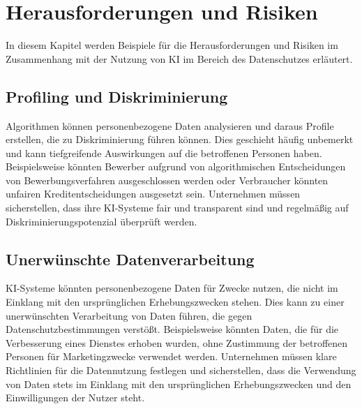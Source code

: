 \chapter{Herausforderungen und Risiken}

In diesem Kapitel werden Beispiele für die Herausforderungen und Risiken im Zusammenhang mit
der Nutzung von KI im Bereich des Datenschutzes erläutert. 




\section{Profiling und Diskriminierung}

Algorithmen können personenbezogene Daten analysieren und daraus Profile
erstellen, die zu Diskriminierung führen können. Dies geschieht häufig unbemerkt
und kann tiefgreifende Auswirkungen auf die betroffenen Personen haben.
Beispielsweise könnten Bewerber aufgrund von algorithmischen Entscheidungen von
Bewerbungsverfahren ausgeschlossen werden oder Verbraucher könnten unfairen
Kreditentscheidungen ausgesetzt sein. Unternehmen müssen sicherstellen, dass
ihre KI-Systeme fair und transparent sind und regelmäßig auf
Diskriminierungspotenzial überprüft werden.

\section{Unerwünschte Datenverarbeitung}

KI-Systeme könnten personenbezogene Daten für Zwecke nutzen, die nicht im
Einklang mit den ursprünglichen Erhebungszwecken stehen. Dies kann zu einer
unerwünschten Verarbeitung von Daten führen, die gegen Datenschutzbestimmungen
verstößt. Beispielsweise könnten Daten, die für die Verbesserung eines Dienstes
erhoben wurden, ohne Zustimmung der betroffenen Personen für Marketingzwecke
verwendet werden. Unternehmen müssen klare Richtlinien für die Datennutzung
festlegen und sicherstellen, dass die Verwendung von Daten stets im Einklang mit
den ursprünglichen Erhebungszwecken und den Einwilligungen der Nutzer steht.
